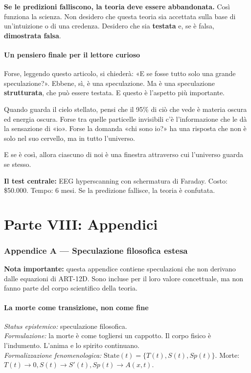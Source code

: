 \documentclass[11pt,a4paper]{article}
\begin{document}
\textbf{Se le predizioni falliscono, la teoria deve essere abbandonata.} Così funziona la scienza. Non desidero che questa teoria sia accettata sulla base di un'intuizione o di una credenza. Desidero che sia \textbf{testata} e, se è falsa, \textbf{dimostrata falsa}.

\subsection{Un pensiero finale per il lettore curioso}
Forse, leggendo questo articolo, si chiederà: «E se fosse tutto solo una grande speculazione?». Ebbene, sì, è una speculazione. Ma è una speculazione \textbf{strutturata}, che può essere testata. E questo è l'aspetto più importante.

Quando guarda il cielo stellato, pensi che il 95\% di ciò che vede è materia oscura ed energia oscura. Forse tra quelle particelle invisibili c'è l'informazione che le dà la sensazione di «io». Forse la domanda «chi sono io?» ha una risposta che non è solo nel suo cervello, ma in tutto l'universo.

E se è così, allora ciascuno di noi è una finestra attraverso cui l'universo guarda se stesso.

\textbf{Il test centrale:} EEG hyperscanning con schermatura di Faraday. Costo: \$50.000. Tempo: 6 mesi. Se la predizione fallisce, la teoria è confutata.

\newpage
\part*{Parte VIII: Appendici}

\section{Appendice A --- Speculazione filosofica estesa}
\textbf{Nota importante:} questa appendice contiene speculazioni che non derivano dalle equazioni di ART-12D. Sono incluse per il loro valore concettuale, ma non fanno parte del corpo scientifico della teoria.

\subsection{La morte come transizione, non come fine}
\textit{Status epistemico:} speculazione filosofica. \\
\textit{Formulazione:} la morte è come togliersi un cappotto. Il corpo fisico è l'indumento. L'anima e lo spirito continuano. \\
\textit{Formalizzazione fenomenologica:} $\text{State}(t) = \{ T(t), S(t), Sp(t) \}$. Morte: $T(t) \to 0, S(t) \to S'(t), Sp(t) \to A(x,t)$.
\end{document}
